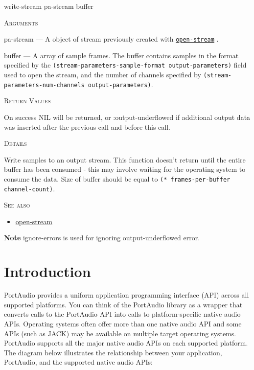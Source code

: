 \documentclass[a4paper]{report}
\begin{document}
    \label{portaudio__fun__write-stream}
    \begin{defun}[Function]
    write-stream pa-stream buffer


    
    \bigskip
    \textsc{Arguments}

pa-stream
	--- A object of stream previously created with \hyperref[portaudio__fun__open-stream]{\texttt{open-stream}}
  .

buffer
	--- A array of sample frames. The buffer contains samples in the format specified by the \texttt{(stream-parameters-sample-format output-parameters)} field used to open the stream, and the number of channels specified by \texttt{(stream-parameters-num-channels output-parameters)}.




    
    \bigskip
    \textsc{Return Values}


On success NIL will be returned, or :output-underflowed if additional output data was inserted after the previous call and before this call. 


	
    \bigskip
    \textsc{Details}

Write samples to an output stream. This function doesn't return until the entire buffer has been consumed - this may involve waiting for the operating system to consume the data. Size of buffer should be equal to \texttt{(* frames-per-buffer channel-count)}.






      
    \bigskip
    \textsc{See also}


	
    \begin{itemize}
    
	  
    \item
    \hyperref[portaudio__fun__open-stream]{open-stream}
    
	
    \end{itemize}
  
      


    
    \end{defun}
  
  

\textbf{Note}
ignore-errors is used for ignoring output-underflowed error.

\section{Introduction} \label{d0d0e0e0e0e2}
PortAudio provides a uniform application programming interface (API) across all supported platforms. You can think of the PortAudio library as a wrapper that converts calls to the PortAudio API into calls to platform-specific native audio APIs. Operating systems often offer more than one native audio API and some APIs (such as JACK) may be available on multiple target operating systems. PortAudio supports all the major native audio APIs on each supported platform. The diagram below illustrates the relationship between your application, PortAudio, and the supported native audio APIs:
\end{document}
